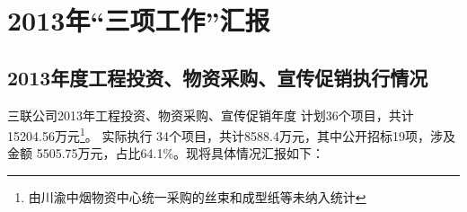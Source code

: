 ﻿\chapter{2013年“三项工作”汇报}
\section{2013年度工程投资、物资采购、宣传促销执行情况} \sanhao

\indent 三联公司2013年工程投资、物资采购、宣传促销年度
计划36个项目，共计15204.56万元\footnote{由川渝中烟物资中心统一采购的丝束和成型纸等未纳入统计}。
实际执行 34个项目，共计8588.4万元，其中公开招标19项，涉及金额 5505.75万元，占比64.1\%。现将具体情况汇报如下：

\renewcommand{\labelenumi}{\indent \chinese{enumi}}
